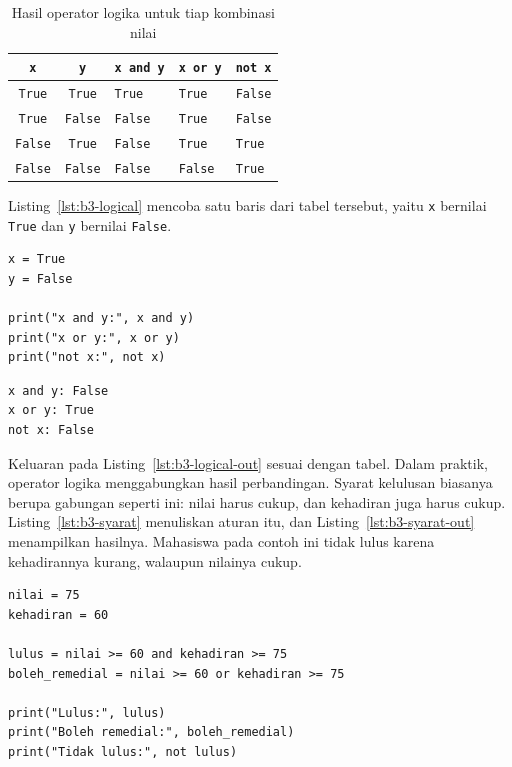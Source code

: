 \begin{table}[H]
  \centering
  \caption{Hasil operator logika untuk tiap kombinasi nilai}
  \label{tab:b3-kebenaran}
  \begin{tabularx}{\textwidth}{ccXXX}
    \hline
    \textbf{\texttt{x}} & \textbf{\texttt{y}} & \textbf{\texttt{x and y}} & \textbf{\texttt{x or y}} & \textbf{\texttt{not x}} \\
    \hline
    \texttt{True} & \texttt{True} & \texttt{True} & \texttt{True} & \texttt{False} \\
    \hline
    \texttt{True} & \texttt{False} & \texttt{False} & \texttt{True} & \texttt{False} \\
    \hline
    \texttt{False} & \texttt{True} & \texttt{False} & \texttt{True} & \texttt{True} \\
    \hline
    \texttt{False} & \texttt{False} & \texttt{False} & \texttt{False} & \texttt{True} \\
    \hline
  \end{tabularx}
\end{table}

Listing~\ref{lst:b3-logical} mencoba satu baris dari tabel tersebut, yaitu \texttt{x} bernilai \texttt{True} dan \texttt{y} bernilai \texttt{False}.

\begin{lstlisting}[style=PythonStyle, caption={Kode Python: logical_operator.py}, label={lst:b3-logical}]
x = True
y = False

print("x and y:", x and y)
print("x or y:", x or y)
print("not x:", not x)
\end{lstlisting}

\begin{lstlisting}[language=bash, caption={Keluaran logical_operator.py}, label={lst:b3-logical-out}]
x and y: False
x or y: True
not x: False
\end{lstlisting}

Keluaran pada Listing~\ref{lst:b3-logical-out} sesuai dengan tabel. Dalam praktik, operator logika menggabungkan hasil perbandingan. Syarat kelulusan biasanya berupa gabungan seperti ini: nilai harus cukup, dan kehadiran juga harus cukup. Listing~\ref{lst:b3-syarat} menuliskan aturan itu, dan Listing~\ref{lst:b3-syarat-out} menampilkan hasilnya. Mahasiswa pada contoh ini tidak lulus karena kehadirannya kurang, walaupun nilainya cukup.

\begin{lstlisting}[style=PythonStyle, caption={Kode Python: syarat_lulus.py}, label={lst:b3-syarat}]
nilai = 75
kehadiran = 60

lulus = nilai >= 60 and kehadiran >= 75
boleh_remedial = nilai >= 60 or kehadiran >= 75

print("Lulus:", lulus)
print("Boleh remedial:", boleh_remedial)
print("Tidak lulus:", not lulus)
\end{lstlisting}

